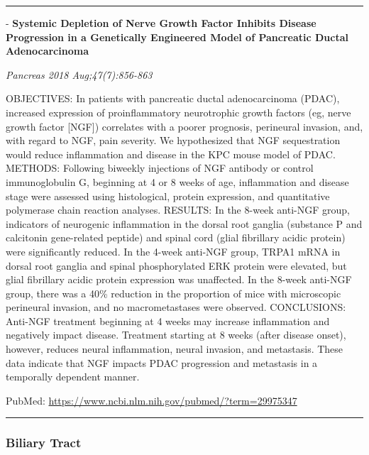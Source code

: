 \documentclass[]{article}
\begin{document}
{}

{}

\begin{center}\rule{0.5\linewidth}{\linethickness}\end{center}

 - \textbf{Systemic Depletion of Nerve Growth Factor Inhibits Disease
Progression in a Genetically Engineered Model of Pancreatic Ductal
Adenocarcinoma}

\emph{Pancreas 2018 Aug;47(7):856-863}

OBJECTIVES: In patients with pancreatic ductal adenocarcinoma (PDAC),
increased expression of proinflammatory neurotrophic growth factors (eg,
nerve growth factor {[}NGF{]}) correlates with a poorer prognosis,
perineural invasion, and, with regard to NGF, pain severity. We
hypothesized that NGF sequestration would reduce inflammation and
disease in the KPC mouse model of PDAC. METHODS: Following biweekly
injections of NGF antibody or control immunoglobulin G, beginning at 4
or 8 weeks of age, inflammation and disease stage were assessed using
histological, protein expression, and quantitative polymerase chain
reaction analyses. RESULTS: In the 8-week anti-NGF group, indicators of
neurogenic inflammation in the dorsal root ganglia (substance P and
calcitonin gene-related peptide) and spinal cord (glial fibrillary
acidic protein) were significantly reduced. In the 4-week anti-NGF
group, TRPA1 mRNA in dorsal root ganglia and spinal phosphorylated ERK
protein were elevated, but glial fibrillary acidic protein expression
was unaffected. In the 8-week anti-NGF group, there was a 40\% reduction
in the proportion of mice with microscopic perineural invasion, and no
macrometastases were observed. CONCLUSIONS: Anti-NGF treatment beginning
at 4 weeks may increase inflammation and negatively impact disease.
Treatment starting at 8 weeks (after disease onset), however, reduces
neural inflammation, neural invasion, and metastasis. These data
indicate that NGF impacts PDAC progression and metastasis in a
temporally dependent manner.

PubMed: \url{https://www.ncbi.nlm.nih.gov/pubmed/?term=29975347}

{}

{}

\begin{center}\rule{0.5\linewidth}{\linethickness}\end{center}

\hypertarget{biliary-tract-3}{%
\subsubsection{Biliary Tract}\label{biliary-tract-3}}
\end{document}
